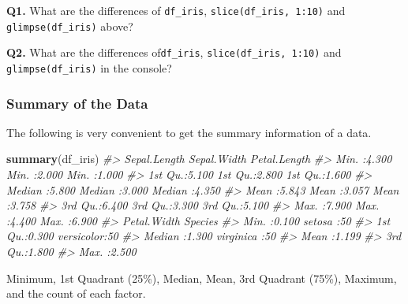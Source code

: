 \documentclass[
  xelatex, ja=standard]{bxjsbook}
\newenvironment{Shaded}{\begin{snugshade}}{\end{snugshade}}
\newcommand{\CommentTok}[1]{\textcolor[rgb]{0.56,0.35,0.01}{\textit{#1}}}
\newcommand{\FunctionTok}[1]{\textcolor[rgb]{0.13,0.29,0.53}{\textbf{#1}}}
\newcommand{\NormalTok}[1]{#1}
\newcommand{\SpecialCharTok}[1]{\textcolor[rgb]{0.81,0.36,0.00}{\textbf{#1}}}
\theoremstyle{definition}
\theoremstyle{definition}
\theoremstyle{definition}
\theoremstyle{definition}
\theoremstyle{remark}
\begin{document}
\begin{Shaded}
\end{Shaded}

\textbf{Q1.} What are the differences of \texttt{df\_iris}, \texttt{slice(df\_iris,\ 1:10)} and \texttt{glimpse(df\_iris)} above?

\textbf{Q2.} What are the differences of\texttt{df\_iris}, \texttt{slice(df\_iris,\ 1:10)} and \texttt{glimpse(df\_iris)} in the console?

\hypertarget{summary-of-the-data}{%
\subsubsection{Summary of the Data}\label{summary-of-the-data}}

The following is very convenient to get the summary information of a data.

\begin{Shaded}
\begin{Highlighting}[]
\FunctionTok{summary}\NormalTok{(df\_iris)}
\CommentTok{\#\textgreater{}   Sepal.Length    Sepal.Width     Petal.Length  }
\CommentTok{\#\textgreater{}  Min.   :4.300   Min.   :2.000   Min.   :1.000  }
\CommentTok{\#\textgreater{}  1st Qu.:5.100   1st Qu.:2.800   1st Qu.:1.600  }
\CommentTok{\#\textgreater{}  Median :5.800   Median :3.000   Median :4.350  }
\CommentTok{\#\textgreater{}  Mean   :5.843   Mean   :3.057   Mean   :3.758  }
\CommentTok{\#\textgreater{}  3rd Qu.:6.400   3rd Qu.:3.300   3rd Qu.:5.100  }
\CommentTok{\#\textgreater{}  Max.   :7.900   Max.   :4.400   Max.   :6.900  }
\CommentTok{\#\textgreater{}   Petal.Width          Species  }
\CommentTok{\#\textgreater{}  Min.   :0.100   setosa    :50  }
\CommentTok{\#\textgreater{}  1st Qu.:0.300   versicolor:50  }
\CommentTok{\#\textgreater{}  Median :1.300   virginica :50  }
\CommentTok{\#\textgreater{}  Mean   :1.199                  }
\CommentTok{\#\textgreater{}  3rd Qu.:1.800                  }
\CommentTok{\#\textgreater{}  Max.   :2.500}
\end{Highlighting}
\end{Shaded}

Minimum, 1st Quadrant (25\%), Median, Mean, 3rd Quadrant (75\%), Maximum, and the count of each factor.
\end{document}
